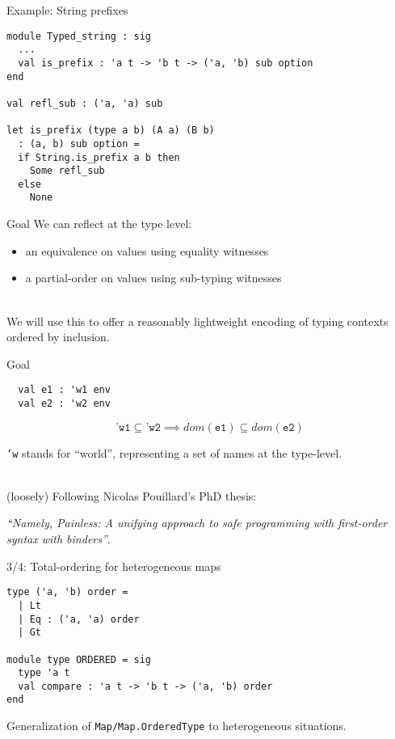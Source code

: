 \documentclass{beamer}          %
\begin{document}
\begin{frame}[fragile]{Example: String prefixes}

\begin{lstlisting}
module Typed_string : sig
  ...
  val is_prefix : 'a t -> 'b t -> ('a, 'b) sub option
end

val refl_sub : ('a, 'a) sub

let is_prefix (type a b) (A a) (B b)
  : (a, b) sub option =
  if String.is_prefix a b then
    Some refl_sub
  else
    None
\end{lstlisting}
\end{frame}

\begin{frame}{Goal}
  We can reflect at the type level:
  \begin{itemize}
    \item an equivalence on values using equality witnesses
    \item a partial-order on values using sub-typing witnesses
  \end{itemize}

  ~ \\

  We will use this to offer a reasonably lightweight encoding of
  typing contexts ordered by inclusion.
\end{frame}

\begin{frame}[fragile]{Goal}
  \begin{lstlisting}
  val e1 : 'w1 env
  val e2 : 'w2 env
  \end{lstlisting}
  $$
  \texttt{'w1} \subseteq \texttt{'w2} \implies dom(\texttt{e1}) \subseteq dom(\texttt{e2})
  $$

  \texttt{'w} stands for ``world'', representing a set of names at the type-level.

  ~ \\

  (loosely) Following Nicolas Pouillard's PhD thesis:

  {\em ``Namely, Painless: A unifying approach to safe programming with first-order syntax with binders''}.
\end{frame}

\begin{frame}[fragile]{3/4: Total-ordering for heterogeneous maps}
\begin{lstlisting}
type ('a, 'b) order =
  | Lt
  | Eq : ('a, 'a) order
  | Gt

module type ORDERED = sig
  type 'a t
  val compare : 'a t -> 'b t -> ('a, 'b) order
end
\end{lstlisting}

Generalization of \lstinline{Map/Map.OrderedType} to heterogeneous situations.
\end{frame}
\end{document}
